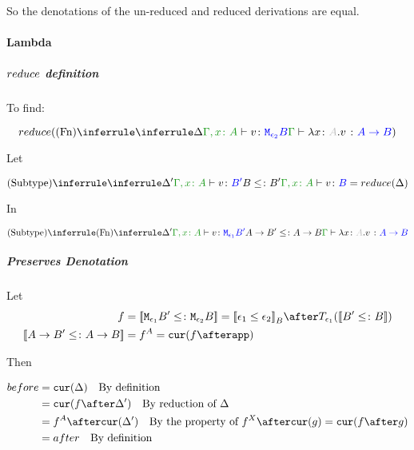 \documentclass{report}
\begin{document}
        So the denotations of the un-reduced and reduced derivations are equal.

        \paragraph{Lambda}
        \subparagraph{$reduce$ definition}
            To find:
        
            \begin{equation}
                \reduce(\ntreeruleI{Fn}{
                    \treeruleI{\D}{\typerelation{\gax}{v}{\M{\e_2}{B}}}
                }{\gtyperelation{\lam{x}{A}{v}}{\ab}})
            \end{equation}

            Let 

            \begin{equation}
                \ntreeruleII{Subtype}{
                    \treeruleI{\D'}{\typerelation{\gax}{v}{B'}}
                    }{B\subtype B'}{
                    \typerelation{\gax}{v}{B}
                } = \reduce(\D)
            \end{equation}

            In

            \begin{equation}
                \ntreeruleII{Subtype}{
                    \ntreeruleI{Fn}{
                        \D'
                    }{
                        \typerelation{\gax}{v}{\M{\e_1}{B'}}
                    }
                    }{
                    \fntype{A}{B'}\subtype\ab
                } {
                    \gtyperelation{\lam{x}{A}{v}}{\ab}
                }
            \end{equation}

        \subparagraph{Preserves Denotation}
            Let
            \begin{align*}
                f &= \deno{\M{\e_1}{B'}\subtype\M{\e_2}{B}} = \deno{\e_1\subeffect\e_2}_B\after\T{\e_1}{(\deno{B'\subtype B})} \\
                \deno{\fntype{A}{B'}\subtype\ab} & = f^A = \cur{f\after \app}
            \end{align*}

            Then

            \begin{align*}
                before & = \cur{\D} \qt{By definition}\\
                        & = \cur{f\after\D'} \qt{By reduction of $\D$} \\
                        & = f^A\after\cur{\D'}\qt{By the property of $f^X\after\cur{g} = \cur{f\after g}$} \\
                        & = after \qt{By definition}\\
            \end{align*}
\end{document}

